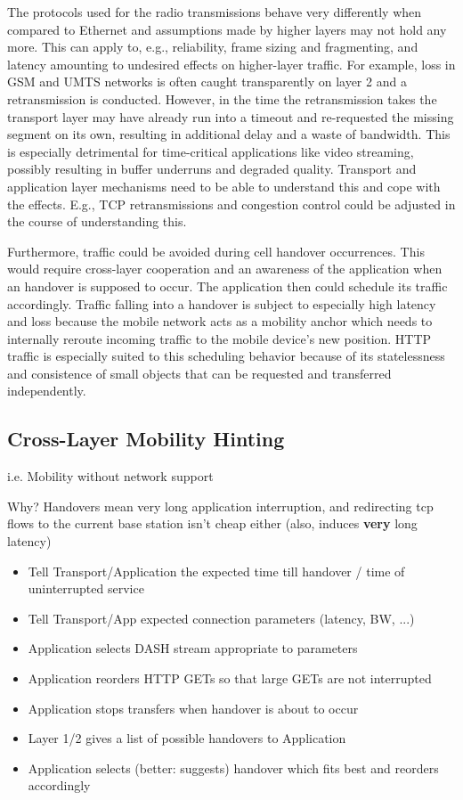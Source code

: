 
The protocols used for the radio transmissions behave very differently when compared to Ethernet and assumptions made by higher layers may not hold any more. This can apply to, e.g., reliability, frame sizing and fragmenting, and latency amounting to undesired effects on higher-layer traffic. For example, loss in GSM and UMTS networks is often caught transparently on layer 2 and a retransmission is conducted. However, in the time the retransmission takes the transport layer may have already run into a timeout and re-requested the missing segment on its own, resulting in additional delay and a waste of bandwidth. This is especially detrimental for time-critical applications like video streaming, possibly resulting in buffer underruns and degraded quality. Transport and application layer mechanisms need to be able to understand this and cope with the effects. E.g., TCP retransmissions and congestion control could be adjusted in the course of understanding this.

Furthermore, traffic could be avoided during cell handover occurrences. This would require cross-layer cooperation and an awareness of the application when an handover is supposed to occur. The application then could schedule its traffic accordingly. Traffic falling into a handover is subject to especially high latency and loss because the mobile network acts as a mobility anchor which needs to internally reroute incoming traffic to the mobile device's new position. HTTP traffic is especially suited to this scheduling behavior because of its statelessness and consistence of small objects that can be requested and transferred independently.


\subsection{Cross-Layer Mobility Hinting}
\label{c5:crosslayerhinting}

i.e. Mobility without network support

Why? Handovers mean very long application interruption, and redirecting tcp flows to the current base station isn't cheap either (also, induces \textbf{very} long latency)

\begin{itemize}
\item Tell Transport/Application the expected time till handover / time of uninterrupted service
\item Tell Transport/App expected connection parameters (latency, BW, ...)
\item Application selects DASH stream appropriate to parameters
\item Application reorders HTTP GETs so that large GETs are not interrupted
\item Application stops transfers when handover is about to occur
\item Layer 1/2 gives a list of possible handovers to Application
\item Application selects (better: suggests) handover which fits best and reorders accordingly
\end{itemize}

